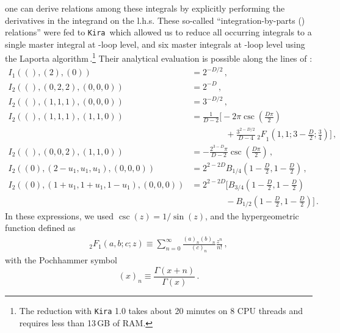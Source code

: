 one can derive relations among these integrals by explicitly performing
the derivatives in the integrand on the l.h.s. These so-called
``integration-by-parts () relations'' were fed to
\texttt{Kira}\,\cite{Maierhoefer:2017hyi} which allowed us to reduce all
occurring integrals to a single master integral at \one-loop level, and
six master integrals at \two-loop level using the Laporta
algorithm\,\cite{Laporta:2001dd}.\footnote{The reduction with
  \texttt{Kira} 1.0 takes about 20 minutes on 8 CPU threads and requires
  less than 13\,GB of RAM.}  Their analytical evaluation is possible
along the lines of :
\begin{equation}
  \begin{split}
    I_1((),(2),(0)) &= 2^{-D/2} \,,\phantom{\Bigg[} \\[10pt]
    I_2((),(0,2,2),(0,0,0)) &= 2^{-D} \,,\phantom{\Bigg[} \\[10pt]
    I_2((),(1,1,1),(0,0,0)) &= 3^{-D/2} \,,\phantom{\Bigg[} \\[10pt]
    I_2((),(1,1,1),(1,1,0)) &= \frac{1}{D-2} \Bigg[ - 2 \pi \csc \left( \frac{D \pi}{2} \right) \\
    & \qquad \qquad+ \frac{3^{2 - D/2}}{D - 4} \, {_2F}_1 \left(1, 1; 3 - \frac{D}{2}; \frac{3}{4} \right) \Bigg] \,,\\[10pt]
    I_2((),(0,0,2),(1,1,0)) &= - \frac{2^{3 - D} \pi}{D - 2} \csc \left( \frac{D \pi}{2} \right) \,, \phantom{\Bigg[} \\[10pt]
    I_2((0),(2-u_1,u_1,u_1),(0,0,0)) &= 2^{2 - 2D} B_{1/4} \left( 1 - \frac{D}{2}, 1 - \frac{D}{2} \right) \,,\phantom{\Bigg[} \\[10pt]
    I_2((0),(1+u_1,1+u_1,1-u_1),(0,0,0)) &= 2^{2 - 2 D} \Bigg[ B_{3/4} \left( 1 - \frac{D}{2}, 1 - \frac{D}{2} \right) \\
    & \qquad \qquad - B_{1/2} \left( 1 - \frac{D}{2}, 1 - \frac{D}{2} \right) \Bigg] \,.
    \label{eq:masters}
  \end{split}
\end{equation}
In these expressions, we used $\csc(z)=1/\sin(z)$, and the
hypergeometric function defined as
\begin{equation}
  \begin{split}
    _2F_1(a,b;c;z) \equiv
    \sum_{n=0}^\infty\frac{(a)_n(b)_n}{(c)_n}\frac{z^n}{n!}\,,
  \end{split}
\end{equation}
with the Pochhammer symbol
\begin{equation}
	(x)_n \equiv \frac{\Gamma ( x + n)}{\Gamma(x)} \,.
\end{equation}
